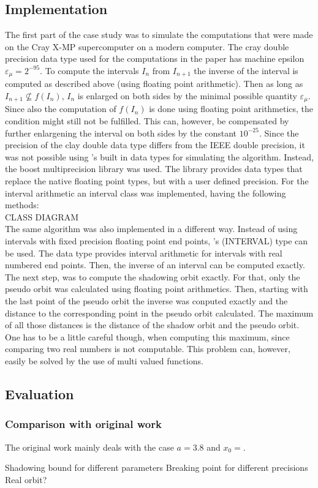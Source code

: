   \subsection{Implementation}
  The first part of the case study was to simulate the computations that were made on the Cray X-MP supercomputer on a modern computer. 
  The cray double precision data type used for the computations in the paper has machine epsilon $\varepsilon_\mu = 2^{-95}$.
  To compute the intervals $I_n$ from $I_{n+1}$ the inverse of the interval is computed as described above (using floating point arithmetic).
  Then as long as $I_{n+1} \not \subseteq f(I_n)$, $I_n$ is enlarged on both sides by the minimal possible quantity $\varepsilon_\mu$. 
  Since also the computation of $f(I_n)$ is done using floating point arithmetics, the condition might still not be fulfilled.
  This can, however, be compensated by further enlargening the interval on both sides by the constant $10^{-25}$.
  Since the precision of the clay double data type differs from the IEEE double precision, it was not possible using \cc's built in data types for simulating the algorithm.
  Instead, the boost multiprecision library \cite{boostmultiprecision} was used. 
  The library provides data types that replace the native \cc floating point types, but with a user defined precision. 
  For the interval arithmetic an interval class was implemented, having the following methods:\\
  CLASS DIAGRAM \\
  The same algorithm was also implemented in a different way. 
  Instead of using intervals with fixed precision floating point end points, \irram's \code(INTERVAL) type can be used. 
  The data type provides interval arithmetic for intervals with real numbered end points.
  Then, the inverse of an interval can be computed exactly.
  The next step, was to compute the shadowing orbit exactly.
  For that, only the pseudo orbit was calculated using floating point arithmetics. 
  Then, starting with the last point of the pseudo orbit the inverse was conputed exactly and the distance to the corresponding point in the pseudo orbit calculated.
  The maximum of all those distances is the distance of the shadow orbit and the pseudo orbit.
  One has to be a little careful though, when computing this maximum, since comparing two real numbers is not computable. 
  This problem can, however, easily be solved by the use of multi valued functions. 
  \subsection{Evaluation}
  \subsubsection{Comparison with original work}
  The original work mainly deals with the case $a=3.8$ and $x_0 = $.

  Shadowing bound for different parameters
  Breaking point for different precisions
  Real orbit?

